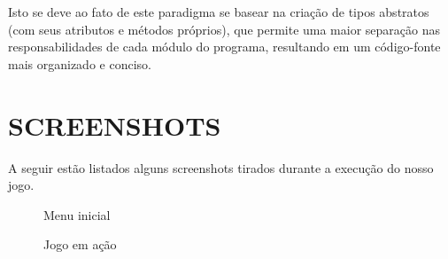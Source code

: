 \documentclass[rel_mlp]{iiufrgs}
\begin{document}
Isto se deve ao fato de este paradigma se basear na criação de tipos abstratos (com seus atributos e métodos próprios), que permite uma maior separação nas responsabilidades de cada módulo do programa, resultando em um código-fonte mais organizado e conciso.


%
\chapter{SCREENSHOTS}

A seguir estão listados alguns screenshots tirados durante a execução do nosso jogo.

\begin{figure}[htb]
    \centering
    \caption{Menu inicial}
    \label{fig:figura1}
\end{figure}

\begin{figure}[htb]
    \centering
    \caption{Jogo em ação}
    \label{fig:figura1}
\end{figure}
\end{document}
